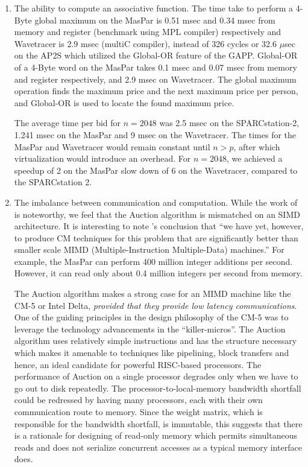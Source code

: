 \begin{enumerate}
\item The ability to compute an associative function.
The time take to  perform a 4-Byte global maximum on the MasPar is 0.51
msec and 0.34 msec from memory and register (benchmark using
MPL compiler) respectively and  Wavetracer is 2.9 msec (multiC
compiler), instead of 326 cycles or 32.6 $\mu$sec on the AP2S which
utilized the Global-OR feature of the GAPP.  Global-OR of a 4-Byte word
on the MasPar
takes 0.1 msec and 0.07 msec from memory and register
respectively, and 2.9 msec on Wavetracer.  The global maximum operation
finds the maximum price and the next maximum price per person,
and Global-OR is used to locate the found maximum price.
 
The average time per bid for $n = 2048$ was 2.5 msec 
on the SPARCstation-2, 1.241 msec on the MasPar and 9 msec
on the Wavetracer.   The times for the MasPar and
Wavetracer would remain constant until $n > p$, after which virtualization
would introduce an overhead.
For $n = 2048$, we achieved a speedup of 2 on the 
MasPar slow down of 6 on the Wavetracer, compared to the SPARCstation 2.

\item The imbalance between communication and computation.
While the work of \cite{weze91} is noteworthy, we feel that the 
Auction algorithm is mismatched on an SIMD architecture. 
It is interesting to note \cite{weze91}'s conclusion that
``we have yet, however, to produce CM techniques for this problem
that are significantly better than smaller scale MIMD 
(Multiple-Instruction Multiple-Data) machines.''
For example, the MasPar can perform 400 million integer additions
per second. However, it can read only about 0.4 million integers
per second from memory. 

The Auction algorithm makes a strong case for an MIMD machine like
the CM-5 or Intel Delta, {\em provided that they provide low latency
communications}. One of the guiding principles in the design
philosophy of the CM-5 was to leverage the technology advancements
in the ``killer-micros''. The Auction algorithm uses relatively
simple instructions and has the structure
necessary which makes it amenable to techniques like 
pipelining, block transfers and hence,
an ideal candidate for powerful RISC-based processors.
The performance of Auction on a single processor degrades
only when we have to go out to disk repeatedly. The processor-to-local-memory
bandwidth shortfall could be redressed by having many processors,
each with their own communication route to memory. Since the 
weight matrix, which is responsible for the bandwidth shortfall,
is immutable, this suggests that there is a rationale for
designing of read-only memory which
permits simultaneous reads and does not serialize concurrent
accesses as a typical memory interface does.


\end{enumerate}

